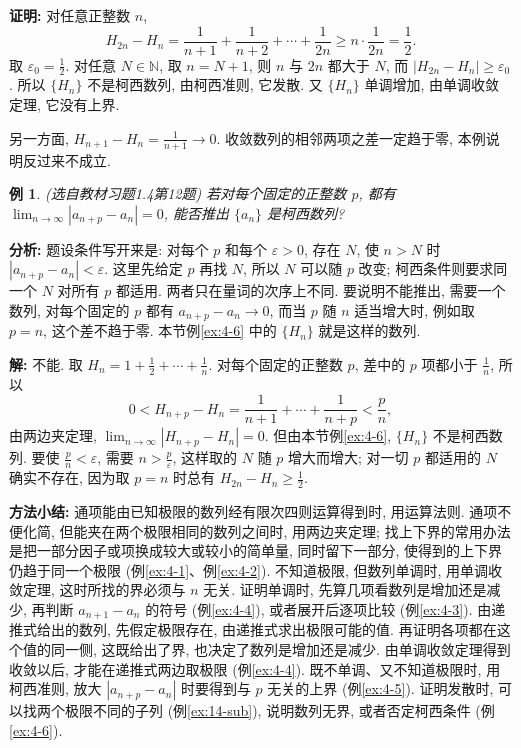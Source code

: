\documentclass[UTF8,openany]{ctexbook}
\theoremstyle{chinesetextbook}
\newtheorem{example}{例}[section]
\newenvironment{cnproof}{\par\indent\textbf{证明:} \ignorespaces}{\par}
\newenvironment{cnsolution}{\par\indent\textbf{解:} \ignorespaces}{\par}
\begin{document}
\begin{cnproof}
对任意正整数 $n$,
\[
H_{2n}-H_n=\frac1{n+1}+\frac1{n+2}+\cdots+\frac1{2n}\ge n\cdot\frac1{2n}=\frac12.
\]
取 $\displaystyle\varepsilon_0=\frac12$. 对任意 $N\in\mathbb N$, 取 $n=N+1$, 则 $n$ 与 $2n$ 都大于 $N$, 而 $|H_{2n}-H_n|\ge\varepsilon_0$. 所以 $\{H_n\}$ 不是柯西数列, 由柯西准则, 它发散. 又 $\{H_n\}$ 单调增加, 由单调收敛定理, 它没有上界.

另一方面, $\displaystyle H_{n+1}-H_n=\frac1{n+1}\to0$. 收敛数列的相邻两项之差一定趋于零, 本例说明反过来不成立.
\end{cnproof}
\begin{example}
\textnormal{(选自教材习题1.4第12题)} 若对每个固定的正整数 $p$, 都有 $\displaystyle\lim_{n\to\infty}|a_{n+p}-a_n|=0$, 能否推出 $\{a_n\}$ 是柯西数列?
\end{example}
\par\indent\textbf{分析:} 题设条件写开来是: 对每个 $p$ 和每个 $\varepsilon>0$, 存在 $N$, 使 $n>N$ 时 $|a_{n+p}-a_n|<\varepsilon$. 这里先给定 $p$ 再找 $N$, 所以 $N$ 可以随 $p$ 改变; 柯西条件则要求同一个 $N$ 对所有 $p$ 都适用. 两者只在量词的次序上不同. 要说明不能推出, 需要一个数列, 对每个固定的 $p$ 都有 $a_{n+p}-a_n\to0$, 而当 $p$ 随 $n$ 适当增大时, 例如取 $p=n$, 这个差不趋于零. 本节例\ref{ex:4-6} 中的 $\{H_n\}$ 就是这样的数列.
\begin{cnsolution}
不能. 取 $\displaystyle H_n=1+\frac12+\cdots+\frac1n$. 对每个固定的正整数 $p$, 差中的 $p$ 项都小于 $\displaystyle\frac1n$, 所以
\[
0<H_{n+p}-H_n=\frac1{n+1}+\cdots+\frac1{n+p}<\frac pn,
\]
由两边夹定理, $\displaystyle\lim_{n\to\infty}|H_{n+p}-H_n|=0$. 但由本节例\ref{ex:4-6}, $\{H_n\}$ 不是柯西数列. 要使 $\displaystyle\frac pn<\varepsilon$, 需要 $\displaystyle n>\frac p\varepsilon$, 这样取的 $N$ 随 $p$ 增大而增大; 对一切 $p$ 都适用的 $N$ 确实不存在, 因为取 $p=n$ 时总有 $\displaystyle H_{2n}-H_n\ge\frac12$.
\end{cnsolution}
\par\indent\textbf{方法小结:} 通项能由已知极限的数列经有限次四则运算得到时, 用运算法则. 通项不便化简, 但能夹在两个极限相同的数列之间时, 用两边夹定理; 找上下界的常用办法是把一部分因子或项换成较大或较小的简单量, 同时留下一部分, 使得到的上下界仍趋于同一个极限 (例\ref{ex:4-1}、例\ref{ex:4-2}). 不知道极限, 但数列单调时, 用单调收敛定理, 这时所找的界必须与 $n$ 无关. 证明单调时, 先算几项看数列是增加还是减少, 再判断 $a_{n+1}-a_n$ 的符号 (例\ref{ex:4-4}), 或者展开后逐项比较 (例\ref{ex:4-3}). 由递推式给出的数列, 先假定极限存在, 由递推式求出极限可能的值. 再证明各项都在这个值的同一侧, 这既给出了界, 也决定了数列是增加还是减少. 由单调收敛定理得到收敛以后, 才能在递推式两边取极限 (例\ref{ex:4-4}). 既不单调、又不知道极限时, 用柯西准则, 放大 $|a_{n+p}-a_n|$ 时要得到与 $p$ 无关的上界 (例\ref{ex:4-5}). 证明发散时, 可以找两个极限不同的子列 (例\ref{ex:14-sub}), 说明数列无界, 或者否定柯西条件 (例\ref{ex:4-6}).
\end{document}
